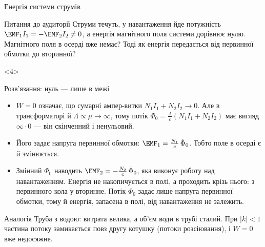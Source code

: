 \documentclass[onlytextwidth]{beamer}
\begin{document}
\begin{frame}{Енергія системи струмів}{}
\begin{onlyenv}
\begin{alertblock}{Питання до аудиторії}
		Струми течуть, у навантаження йде потужність $\EMF_1I_1 = -\EMF_2I_2 \neq 0$, а енергія магнітного поля системи \alert{дорівнює нулю}.
		Магнітного поля в осерді вже немає? Тоді як енергія передається від первинної обмотки до вторинної?
	\end{alertblock}
	\end{onlyenv}
	\begin{onlyenv}
	\begin{block}{Розв'язання: нуль --- лише в межі}\justifying
		\begin{itemize}
			\item $W = 0$ означає, що \alert{сумарні ампер-витки} $N_1I_1 + N_2I_2 \to 0$. Але в трансформаторі й $\Lambda \propto \mu \to \infty$,
			тому потік $\Phi_0 = \frac{\Lambda}{c}(N_1I_1 + N_2I_2)$ має вигляд $\infty\cdot 0$ --- він \alert{скінченний і ненульовий}.
			\item Його задає напруга первинної обмотки: $\EMF_1 = \frac{N_1}{c}\,\dot\Phi_0$. Тобто поле в осерді є й \alert{змінюється}.
			\item Змінний $\Phi_0$ наводить $\EMF_2 = -\frac{N_2}{c}\,\dot\Phi_0$, яка виконує роботу над навантаженням. Енергія
			\alert{не накопичується в полі, а проходить крізь нього}: з первинного кола у вторинне. Потік $\Phi_0$ задає лише напруга первинної
			обмотки, тому й енергія, запасена в полі, від навантаження не залежить.
		\end{itemize}
	\end{block}
	\begin{block}{Аналогія}\justifying
		Труба з водою: витрата велика, а об'єм води в трубі сталий. При $|k| < 1$ частина потоку замикається повз другу котушку
		(потоки розсіювання), і $W = 0$ вже недосяжне.
	\end{block}
	\end{onlyenv}
\end{frame}
\end{document}

